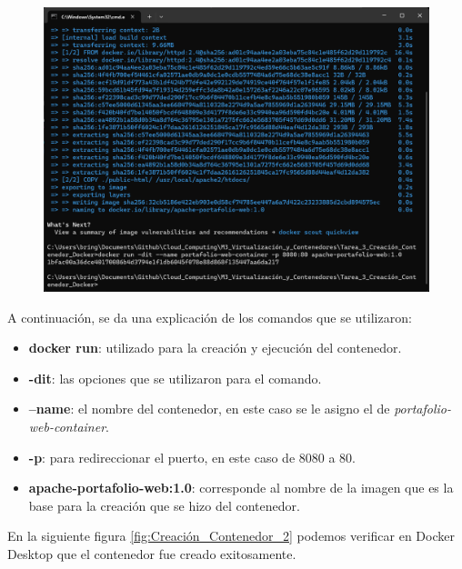 \documentclass[12pt,a4paper]{article}
\begin{document}
\begin{figure}[H]
    \centering
    \includegraphics[width=1\linewidth]{M3_Virtualización_y_Contenedores/Tarea_3_Creación_Contenedor_Docker/reporte/figuras/4-1_Creación_del_Contenedor.png}
    \label{fig:Creación_Contenedor_1}
\end{figure}

A continuación, se da una explicación de los comandos que se utilizaron:

\begin{itemize}
    \item \textbf{docker run}: utilizado para la creación y ejecución del contenedor.
    \item \textbf{-dit}: las opciones que se utilizaron para el comando.
    \item \textbf{--name}: el nombre del contenedor, en este caso se le asigno el de \textit{portafolio-web-container}.
    \item \textbf{-p}: para redireccionar el puerto, en este caso de 8080 a 80.
    \item \textbf{apache-portafolio-web:1.0}: corresponde al nombre de la imagen que es la base para la creación que se hizo del contenedor.
\end{itemize}

En la siguiente figura \ref{fig:Creación_Contenedor_2} podemos verificar en Docker Desktop que el contenedor fue creado exitosamente.
\end{document}
